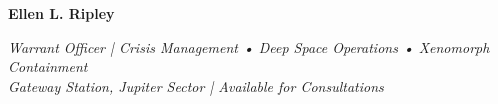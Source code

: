 \begin{compactheader}
\noindent
\begin{minipage}[c]{0.4\textwidth}
  \raggedright
  {\Huge \textbf{\color{primary}Ellen L. Ripley}}
\end{minipage}
\hfill
\begin{minipage}[c]{0.48\textwidth}
  \raggedleft
  \vspace*{2pt}
  {\small\itshape Warrant Officer | Crisis Management • Deep Space Operations • Xenomorph Containment} \\
  {\small\itshape Gateway Station, Jupiter Sector | Available for Consultations}
\end{minipage}
\end{compactheader}
